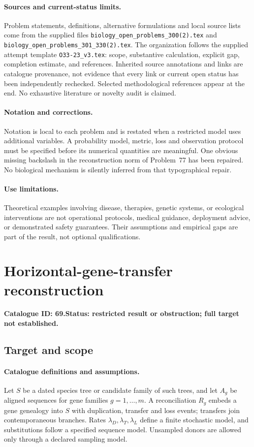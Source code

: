 \documentclass[11pt]{article}
\begin{document}
\paragraph{Sources and current-status limits.}
Problem statements, definitions, alternative formulations and local source lists
come from the supplied files
\texttt{biology\_open\_problems\_300(2).tex} and
\texttt{biology\_open\_problems\_301\_330(2).tex}.
The organization follows the supplied attempt template
\texttt{O33-23\_v3.tex}: scope, substantive calculation, explicit gap,
completion estimate, and references. Inherited source annotations and links are
catalogue provenance, not evidence that every link or current open status has
been independently rechecked. Selected methodological references appear at the
end. No exhaustive literature or novelty audit is claimed.

\paragraph{Notation and corrections.}
Notation is local to each problem and is restated when a restricted model uses
additional variables. A probability model, metric, loss and observation protocol
must be specified before its numerical quantities are meaningful. One obvious
missing backslash in the reconstruction norm of Problem~77 has been repaired.
No biological mechanism is silently inferred from that typographical repair.

\paragraph{Use limitations.}
Theoretical examples involving disease, therapies, genetic systems, or ecological
interventions are not operational protocols, medical guidance, deployment advice,
or demonstrated safety guarantees. Their assumptions and empirical gaps are part
of the result, not optional qualifications.

\setcounter{section}{68}
\section{Horizontal-gene-transfer reconstruction}
\label{prob:069}
\noindent\textbf{Catalogue ID: 69.}\quad \textbf{Status: restricted result or obstruction; full target not established.}
\subsection{Target and scope}
\paragraph{Catalogue definitions and assumptions.}
Let $S$ be a dated species tree or candidate family of such trees, and let $A_g$ be aligned sequences for gene families $g=1,\ldots,m$. A reconciliation $R_g$ embeds a gene genealogy into $S$ with duplication, transfer and loss events; transfers join contemporaneous branches. Rates $\lambda_D,\lambda_T,\lambda_L$ define a finite stochastic model, and substitutions follow a specified sequence model. Unsampled donors are allowed only through a declared sampling model.
\end{document}
